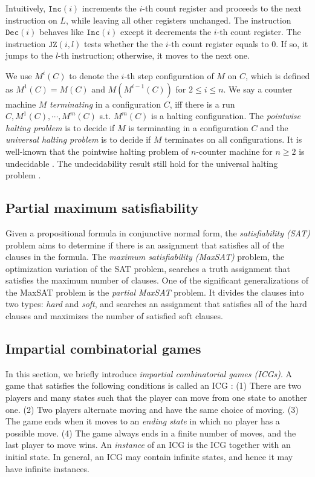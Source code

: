 \documentclass[review]{elsarticle}
\newcommand{\inc}[1][]{\mathtt{Inc}(#1)}
\newcommand{\dec}[1][]{\mathtt{Dec}(#1)}
\newcommand{\jumpZero}[1][]{\mathtt{JZ}(#1)}
\begin{document}
	Intuitively, $\inc[i]$ increments the $i$-th count register and proceeds to the next instruction on $L$, while leaving all other registers unchanged.
	The instruction $\dec[i]$ behaves like $\inc[i]$ except it decrements the $i$-th count register.
	The instruction $\jumpZero[i, l]$ tests whether the the $i$-th count register equals to $0$.
	If so, it jumps to the $l$-th instruction; otherwise, it moves to the next one.
	
	We use $M^i(C)$ to denote the $i$-th step configuration of $M$ on $C$, which is defined as $M^1(C) = M(C)$ and $M(M^{i - 1}(C))$ for $2 \leq i \leq n$.
	We say a counter machine $M$ \textit{terminating} in a configuration $C$, iff there is a run $C, M^1(C), \cdots, M^m(C)$ s.t. $M^m(C)$ is a halting configuration.
	The \textit{pointwise halting problem} is to decide if $M$ is terminating in a configuration $C$ and the \textit{universal halting problem} is to decide if $M$ terminates on all configurations.	
	It is well-known that the pointwise halting problem of $n$-counter machine for $n \geq 2$ is undecidable \cite{Min1967}.
	The undecidability result still hold for the universal halting problem \cite{Cut1980}.
	

	\subsection{Partial maximum satisfiability}
	Given a propositional formula in conjunctive normal form, the \textit{satisfiability (SAT)} problem aims to determine if there is an assignment that satisfies all of the clauses in the formula.
	The \textit{maximum satisfiability (MaxSAT)} problem, the optimization variation of the SAT problem, searches a truth assignment that satisfies the maximum number of clauses.
	One of the significant generalizations of the MaxSAT problem is the \textit{partial MaxSAT} problem.
	It divides the clauses into two types: \textit{hard} and \textit{soft}, and searches an assignment that satisfies all of the hard clauses and maximizes the number of satisfied soft clauses.

	\subsection{Impartial combinatorial games}	
	In this section, we briefly introduce \textit{impartial combinatorial games (ICGs)}.
	A game that satisfies the following conditions is called an ICG \cite{Fer2018}:
	(1) There are two players and many states such that the player can move from one state to another one.
	(2) Two players alternate moving and have the same choice of moving.		
	(3) The game ends when it moves to an \textit{ending state} in which no player has a possible move. 
	(4) The game always ends in a finite number of moves, and the last player to move wins.
	An \textit{instance} of an ICG is the ICG together with an initial state.
	In general, an ICG may contain infinite states, and hence it may have infinite instances.
	
\end{document}
